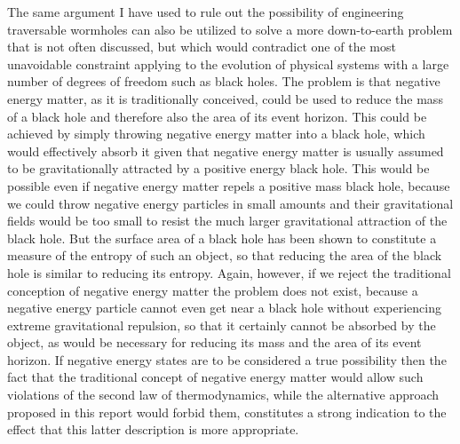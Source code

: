 \documentclass[notitlepage,12pt]{report}
\begin{document}
The same argument I have used to rule out the possibility of engineering traversable wormholes can also be utilized to solve a more down-to-earth problem that is not often discussed, but which would contradict one of the most unavoidable constraint applying to the evolution of physical systems with a large number of degrees of freedom such as black holes. The problem is that negative energy matter, as it is traditionally conceived, could be used to reduce the mass of a black hole and therefore also the area of its event horizon. This could be achieved by simply throwing negative energy matter into a black hole, which would effectively absorb it given that negative energy matter is usually assumed to be gravitationally attracted by a positive energy black hole. This would be possible even if negative energy matter repels a positive mass black hole, because we could throw negative energy particles in small amounts and their gravitational fields would be too small to resist the much larger gravitational attraction of the black hole. But the surface area of a black hole has been shown to constitute a measure of the entropy of such an object, so that reducing the area of the black hole is similar to reducing its entropy. Again, however, if we reject the traditional conception of negative energy matter the problem does not exist, because a negative energy particle cannot even get near a black hole without experiencing extreme gravitational repulsion, so that it certainly cannot be absorbed by the object, as would be necessary for reducing its mass and the area of its event horizon. If negative energy states are to be considered a true possibility then the fact that the traditional concept of negative energy matter would allow such violations of the second law of thermodynamics, while the alternative approach proposed in this report would forbid them, constitutes a strong indication to the effect that this latter description is more appropriate.
\end{document}
